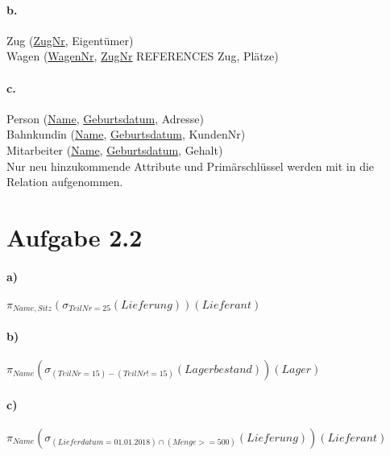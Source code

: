 \documentclass[12pt]{article}
\begin{document}
		\paragraph*{b.}	
			
			Zug (\underline{ZugNr}, Eigentümer)\\[1.3em]
			
			Wagen (\underline{WagenNr}, \underline{ZugNr} REFERENCES Zug, Plätze)\\[1.3em]
			
		\paragraph*{c.}
			Person (\underline{Name}, \underline{Geburtsdatum}, Adresse) \\[1,3em]
			
			Bahnkundin (\underline{Name}, \underline{Geburtsdatum}, KundenNr) \\[1,3em]
			
			Mitarbeiter (\underline{Name}, \underline{Geburtsdatum}, Gehalt) \\[1,3em]
		
			Nur neu hinzukommende Attribute und Primärschlüssel werden mit in die Relation aufgenommen.
	
	\newpage	
	\section*{Aufgabe 2.2}
	
		\paragraph*{a)}
			$\pi_{Name, Sitz}(\sigma_{TeilNr=25}(Lieferung))(Lieferant)$
			
		\paragraph*{b)}
			$\pi_{Name}(\sigma_{(TeilNr=15) - (TeilNr != 15)}(Lagerbestand))(Lager)$
			
		
		\paragraph*{c)}
			$\pi_{Name}(\sigma_{(Lieferdatum = 01.01.2018) \cap (Menge >= 500)}(Lieferung))(Lieferant)$
		
		
		
		
\end{document}
